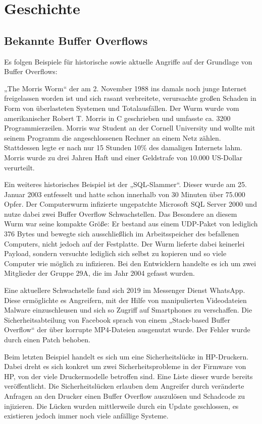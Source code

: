 \section{Geschichte}
\subsection{Bekannte Buffer Overflows}
Es folgen Beispiele für historische sowie aktuelle Angriffe auf der Grundlage von Buffer Overflows:

„The Morris Worm“ der am 2. November 1988 ins damals noch junge Internet freigelassen worden ist und sich rasant verbreitete,
verursachte großen Schaden in Form von überlasteten Systemen und Totalausfällen. Der Wurm wurde vom amerikanischer Robert T. Morris in C geschrieben
und umfasste ca. 3200 Programmierzeilen. Morris war Student an der Cornell University und wollte mit seinem Programm die angeschlossenen Rechner an einem Netz zählen.
Stattdessen legte er nach nur 15 Stunden 10\% des damaligen Internets lahm. Morris wurde zu drei Jahren Haft und einer Geldstrafe von 10.000 US-Dollar verurteilt.

Ein weiteres historisches Beispiel ist der „SQL-Slammer“. Dieser wurde am 25. Januar 2003 entfesselt und hatte schon innerhalb von 30 Minuten über 75.000 Opfer.
Der Computerwurm infizierte ungepatchte Microsoft SQL Server 2000 und nutze dabei zwei Buffer Overflow Schwachstellen.
Das Besondere an diesem Wurm war seine kompakte Größe: Er bestand aus einem UDP-Paket von lediglich 376 Bytes und bewegte sich ausschließlich im Arbeitsspeicher des befallenen 
Computers, nicht jedoch auf der Festplatte. Der Wurm lieferte dabei keinerlei Payload, sondern versuchte lediglich sich selbst zu kopieren und
so viele Computer wie möglich zu infizieren. Bei den Entwicklern handelte es ich um zwei Mitglieder der Gruppe 29A, die im Jahr 2004 gefasst wurden.

Eine aktuellere Schwachstelle fand sich 2019 im Messenger Dienst WhatsApp. Diese ermöglichte es Angreifern,
mit der Hilfe von manipulierten Videodateien Malware einzuschleusen und sich so Zugriff auf Smartphones zu verschaffen.
Die Sicherheitsabteilung von Facebook sprach von einem „Stack-based Buffer Overflow“ der über korrupte MP4-Dateien ausgenutzt wurde.
Der Fehler wurde durch einen Patch behoben.

Beim letzten Beispiel handelt es sich um eine Sicherheitslücke in HP-Druckern.
Dabei dreht es sich konkret um zwei Sicherheitsprobleme in der Firmware von HP, von der viele Druckermodelle betroffen sind.
Eine Liste dieser wurde bereits veröffentlicht. Die Sicherheitslücken erlauben dem Angreifer durch veränderte Anfragen an den Drucker einen Buffer Overflow auszulösen
und Schadcode zu injizieren. Die Lücken wurden mittlerweile durch ein Update geschlossen, es existieren jedoch immer noch viele anfällige Systeme.
